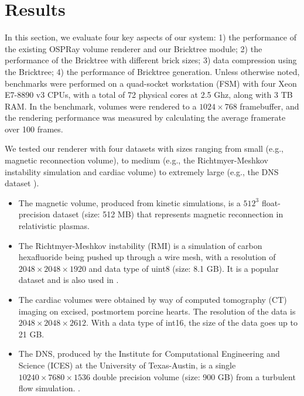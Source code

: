 \section{Results}
\label{sec:results}
In this section, we evaluate four key aspects of our system: 1) the performance of the existing OSPRay
volume renderer and our Bricktree module; 2) the performance of the Bricktree with different brick sizes;
3) data compression using the Bricktree; 4) the performance of Bricktree generation. Unless otherwise noted,
benchmarks were performed on a quad-socket workstation (FSM) with four Xeon E7-8890 v3 CPUs, with a total
of 72 physical cores at 2.5 Ghz, along with 3 TB RAM.
In the benchmark, volumes were rendered to a
$1024 \times 768$ framebuffer, and the rendering performance was measured by calculating the average framerate over 100 frames. 

We tested our renderer with four datasets with sizes ranging from small (e.g., magnetic 
reconnection volume\cite{guo2014formation}), to medium (e.g., the Richtmyer-Meshkov instability simulation
\cite{cohen2002three} and cardiac volume\cite{scivisdata}) to extremely large (e.g., the DNS dataset \cite{moser1999direct}).
\begin{itemize}
\item The magnetic volume, produced from kinetic simulations, is a $512^3$ float-precision dataset
(size: 512 MB) that represents magnetic reconnection in relativistic plasmas. 
\item The Richtmyer-Meshkov instability (RMI) is a simulation of carbon hexafluoride being pushed up through a wire mesh, with a resolution of $2048 \times 2048 \times 1920$ and data type of uint8 (size: 8.1 GB). It is a popular dataset and is also used in \cite{fogal2013analysis, wu2018visit, knoll2006interactive}. 
\item The cardiac volumes were obtained by way of computed tomography (CT) imaging on excised,
postmortem porcine hearts. The resolution of the data is $2048 \times 2048 \times 2612$. With a data
type of int16, the size of the data goes up to 21 GB. 
\item The DNS, produced by the Institute for Computational Engineering and Science (ICES) at the
	University of Texas-Austin, is a single $10240 \times 7680 \times 1536$ double precision volume (size: 900 GB) from a turbulent flow simulation. .  
\end{itemize}

